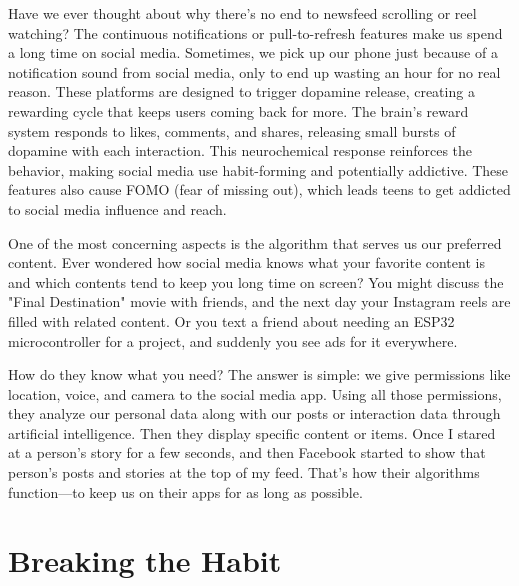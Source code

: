 \documentclass[a4paper,10pt,twocolumn]{memoir}
\begin{document}
{Have we ever thought about why there’s no end to newsfeed scrolling or reel watching? The continuous notifications or pull-to-refresh features make us spend a long time on social media. Sometimes, we pick up our phone just because of a notification sound from social media, only to end up wasting an hour for no real reason. These platforms are designed to trigger dopamine release, creating a rewarding cycle that keeps users coming back for more. The brain’s reward system responds to likes, comments, and shares, releasing small bursts of dopamine with each interaction. This neurochemical response reinforces the behavior, making social media use habit-forming and potentially addictive. These features also cause FOMO (fear of missing out), which leads teens to get addicted to social media influence and reach.

One of the most concerning aspects is the algorithm that serves us our preferred content. Ever wondered how social media knows what your favorite content is and which contents tend to keep you long time on screen? You might discuss the "Final Destination" movie with friends, and the next day your Instagram reels are filled with related content. Or you text a friend about needing an ESP32 microcontroller for a project, and suddenly you see ads for it everywhere.

How do they know what you need? The answer is simple: we give permissions like location, voice, and camera to the social media app. Using all those permissions, they analyze our personal data along with our posts or interaction data through artificial intelligence. Then they display specific content or items. Once I stared at a person’s story for a few seconds, and then Facebook started to show that person’s posts and stories at the top of my feed. That’s how their algorithms function—to keep us on their apps for as long as possible.

\section*{Breaking the Habit}

}
\end{document}
